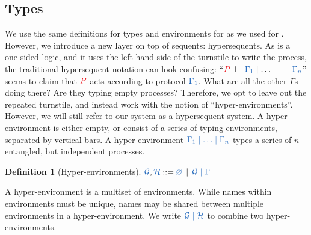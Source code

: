 \documentclass[copyright,creativecommons]{eptcs}
\def\Coloneqq{\mathbin{::=}}
\newtheorem{definition}[lemma]{Definition}
\begin{document}
\subsection{Types}\label{sec:hcp-types}
We use the same definitions for types and environments for \hcp as we used for \cp. However, we introduce a new layer on top of sequents: hypersequents. As \cp is a one-sided logic, and it uses the left-hand side of the turnstile to write the process, the traditional hypersequent notation can look confusing: ``$\seq[P]{\Gamma_1}\hsep\dots\hsep\seq{\Gamma_n}$'' seems to claim that $\tm{P}$ acts according to protocol $\ty{\Gamma_1}$. What are all the other $\Gamma$s doing there? Are they typing empty processes? Therefore, we opt to leave out the repeated turnstile, and instead work with the notion of ``hyper-environments''. However, we will still refer to our system as a hypersequent system. A hyper-environment is either empty, or consist of a series of typing environments, separated by vertical bars. A hyper-environment $\ty{\Gamma_1 \hsep \dots \hsep \Gamma_n}$ types a series of $n$ entangled, but independent processes.
\begin{definition}[Hyper-environments]\label{def:hcp-hyper-environment}
  $\ty{\mathcal{G}}, \ty{\mathcal{H}} \Coloneqq \ty{\emptyhypercontext} \, \mid \, \ty{\mathcal{G} \hsep \Gamma}$
\end{definition}\noindent
A hyper-environment is a multiset of environments. While names within environments must be unique, names may be shared between multiple environments in a hyper-environment. We write $\ty{\mathcal{G} \hsep \mathcal{H}}$ to combine two hyper-environments.
\end{document}
